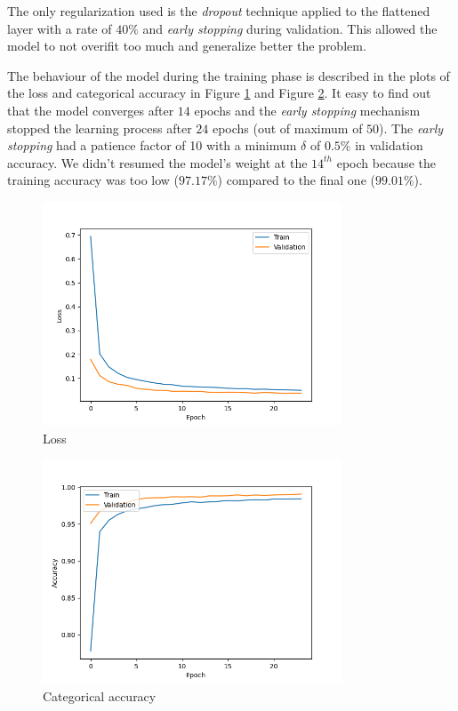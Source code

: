 \documentclass[compsoc]{IEEEtran}
\begin{document}
The only regularization used is the \emph{dropout} technique applied to the flattened layer with a rate of $40\%$ and \emph{early stopping} during validation. This allowed the model to not overifit too much and generalize better the problem. \par
The behaviour of the model during the training phase is described in the plots of the loss and categorical accuracy in 
Figure \ref{fig:loss} and Figure \ref{fig:acc}. 
It easy to find out that the model converges after $14$ epochs and the \emph{early stopping} mechanism stopped the learning process after $24$ epochs (out of maximum of $50$). The \emph{early stopping} had a patience factor of 10 with a minimum $\delta$ of $0.5\%$ in validation accuracy.
We didn't resumed the model's weight at the $14^{th}$ epoch because the training accuracy was too low ($97.17\%$) compared to the final one ($99.01\%$).

\begin{figure}[ht!]
\centering                                                                        
\includegraphics[width=3.5in]{loss.png}
\captionsetup{justification=centering}                                                                                         
\caption{Loss}
\label{fig:loss}                                                                                                                               
\end{figure}


\begin{figure}[ht!]
\centering                                                                        
\includegraphics[width=3.5in]{acc.png}
\captionsetup{justification=centering}                                                                                         
\caption{Categorical accuracy}
\label{fig:acc}                                                                                                                               
\end{figure}
\end{document}
